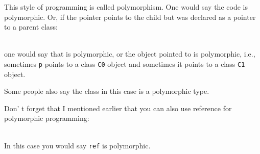 This style of programming is called polymorphism. One would say the code is polymorphic. Or, if the pointer points to the child but was declared as a pointer to a parent class:

\\

one would say that is polymorphic, or the object pointed to is polymorphic, i.e., sometimes \texttt{p} points to a class \texttt{C0} object and sometimes it points to a class \texttt{C1} object.

Some people also say the class in this case is a polymorphic type.

Don' t forget that I mentioned earlier that you can also use reference for polymorphic programming:

\\

In this case you would say \verb!ref! is polymorphic.

